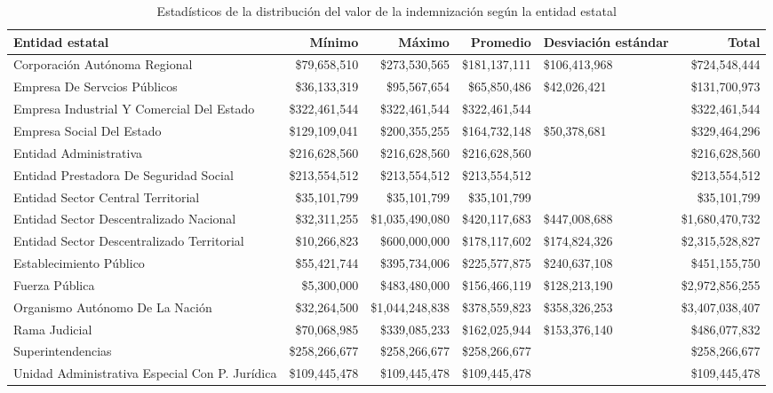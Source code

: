 \begin{sidewaystable}[htbp]
\centering
\caption{Estadísticos de la distribución del
valor de la indemnización según la entidad estatal} 
\label{tab:indementidad}
\begin{tabular}{p{4cm}rrrR{2cm}r}
  \hline
Entidad estatal & Mínimo & Máximo & Promedio & Desviación estándar & Total \\ 
  \hline
Corporación Autónoma Regional & \$79,658,510 & \$273,530,565 & \$181,137,111 & \$106,413,968 & \$724,548,444 \\ 
  Empresa De Servcios Públicos & \$36,133,319 & \$95,567,654 & \$65,850,486 & \$42,026,421 & \$131,700,973 \\ 
  Empresa Industrial Y Comercial Del Estado & \$322,461,544 & \$322,461,544 & \$322,461,544 &  & \$322,461,544 \\ 
  Empresa Social Del Estado & \$129,109,041 & \$200,355,255 & \$164,732,148 & \$50,378,681 & \$329,464,296 \\ 
  Entidad Administrativa & \$216,628,560 & \$216,628,560 & \$216,628,560 &  & \$216,628,560 \\ 
  Entidad Prestadora De Seguridad Social & \$213,554,512 & \$213,554,512 & \$213,554,512 &  & \$213,554,512 \\ 
  Entidad Sector Central Territorial & \$35,101,799 & \$35,101,799 & \$35,101,799 &  & \$35,101,799 \\ 
  Entidad Sector Descentralizado Nacional & \$32,311,255 & \$1,035,490,080 & \$420,117,683 & \$447,008,688 & \$1,680,470,732 \\ 
  Entidad Sector Descentralizado Territorial & \$10,266,823 & \$600,000,000 & \$178,117,602 & \$174,824,326 & \$2,315,528,827 \\ 
  Establecimiento Público & \$55,421,744 & \$395,734,006 & \$225,577,875 & \$240,637,108 & \$451,155,750 \\ 
  Fuerza Pública & \$5,300,000 & \$483,480,000 & \$156,466,119 & \$128,213,190 & \$2,972,856,255 \\ 
  Organismo Autónomo De La Nación & \$32,264,500 & \$1,044,248,838 & \$378,559,823 & \$358,326,253 & \$3,407,038,407 \\ 
  Rama Judicial & \$70,068,985 & \$339,085,233 & \$162,025,944 & \$153,376,140 & \$486,077,832 \\ 
  Superintendencias & \$258,266,677 & \$258,266,677 & \$258,266,677 &  & \$258,266,677 \\ 
  Unidad Administrativa Especial Con P. Jurídica & \$109,445,478 & \$109,445,478 & \$109,445,478 &  & \$109,445,478 \\ 
   \hline
\end{tabular}
\end{sidewaystable}
